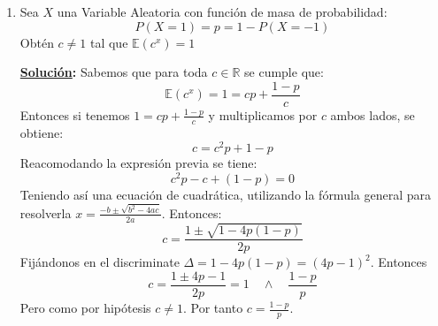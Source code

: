 \documentclass[11pt,letterpaper]{report}
\newcommand{\R}{\mathbb{R}}
\newcommand{\sol}{\textbf{\underline{Solución}: }} %
\begin{document}
\begin{enumerate}
\sol Denotaremos a la variable aleatoria $X$ como la ganancia en pesos que tendrá un jugador escogido
aleatoriamente en el juego.

Como cada ``raspaditos'' tiene un precio de \$10 pesos entonces si gana o no el jugador se le
descontará del premio (en caso de ganar) ó solo habrá sido dinero que gasto el jugador sin ganancia
alguna. Se hace esta observación porque se le restará el precio al valor $x$ que toma la variable
aleatoria.

El número de ``raspaditos'' sin premio es $2,000,000 - 4,000 - 500 - 1 = 1,995,499$.

Teniendo preestablecido eso, podemos dar la función de masa de probabilidad con su imagen; en
este caso siguiendo el enfoque probabilidad clásica, donde es el número de boletos que queremos sobre
el número total de ``raspaditos'' (2,000,000). Entonces:

\begin{align*}
    P(X=x) =
        \begin{cases}
            \frac{1,995,499}{2,000,000} = 0.9977495 & x =-10\\
            \frac{4,000}{2,000,000} = 0.002 & x = 300-10 = 290\\
            \frac{500}{2,000,000} = 0.00025 & x = 8,000 = 7,990\\
            \frac{1}{2,000,000} = 0.0000005 & x =10,000,000-10=9,999,990\\
        \end{cases}
\end{align*}

Obteniendo la esperanza:
\begin{align*}
    \mathds{E}(X)
        &= -10 \cdot 0.9977495 + 290 \cdot 0.002 + 7,990 \cdot 0.00025 + 9,999,990 \cdot 0.0000005\\
        &= -2.4
\end{align*}

\item Sea $X$ una Variable Aleatoria con función de masa de probabilidad: 
\[
    P(X = 1) = p = 1 - P(X = -1)
\]
Obtén $c \not= 1$ tal que $\mathds{E}(c^x)=1$

\sol Sabemos que para toda $c \in \R$ se cumple que:
$$  \mathds{E}(c^x) = 1 = cp + \frac{1-p}{c}    $$
Entonces si tenemos $1 = cp + \frac{1-p}{c}$ y multiplicamos por $c$ ambos lados, se obtiene:
\[
    c = c^2p + 1-p
\]
Reacomodando la expresión previa se tiene:
\[
    c^2p - c + (1-p) = 0
\]
Teniendo así una ecuación de cuadrática, utilizando la fórmula general para resolverla
$   x = \frac{-b \pm \sqrt{b^2 - 4ac}}{2a}  $. Entonces:
\[
    c = \frac{1 \pm \sqrt{1 - 4p(1-p)}}{2p}
\]
Fijándonos en el discriminate $\Delta = 1 - 4p(1-p) = (4p-1)^2$. Entonces
\[
    c = \frac{1 \pm 4p-1}{2p} = 1 \quad \land \quad \frac{1-p}{p}
\]
Pero como por hipótesis $c \not= 1$. Por tanto $c = \frac{1-p}{p}$.



\end{enumerate}
\end{document}
